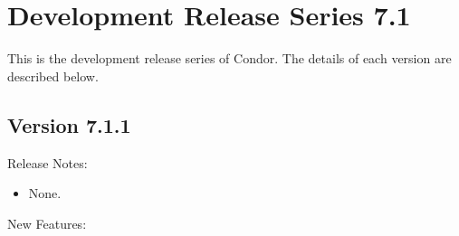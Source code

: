 
\section{\label{sec:History-7-1}Development Release Series 7.1}

This is the development release series of Condor.
The details of each version are described below.

\subsection*{\label{sec:New-7-1-1}Version 7.1.1}

\noindent Release Notes:

\begin{itemize}

\item None.

\end{itemize}


\noindent New Features:

